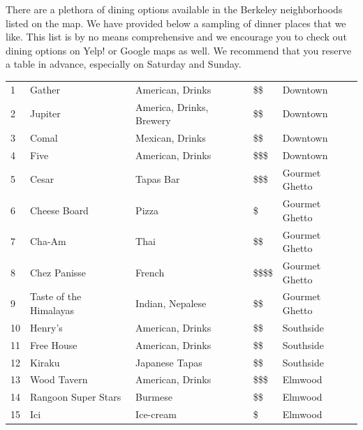 There are a plethora of dining options available in the Berkeley neighborhoods listed on the map. We have provided below a sampling of dinner places that we like. This list is by no means comprehensive and we encourage you to check out dining options on Yelp! or Google maps as well. We recommend that you reserve a table in advance, especially on Saturday and Sunday.

\begingroup
\small
\begin{multicols}{1}[]
    \begin{tabular}{p{0.3cm} p{4cm} p{5cm} p{1cm} p{2cm}}
        1 & Gather & American, Drinks & \$\$ & Downtown \\
        2 & Jupiter & America, Drinks, Brewery & \$\$ & Downtown \\
	    3 & Comal & Mexican, Drinks & \$\$ & Downtown \\       
	    4 & Five & American, Drinks & \$\$\$ & Downtown \\ 
        5 & Cesar & Tapas Bar & \$\$\$ & Gourmet Ghetto\\
        6 & Cheese Board & Pizza & \$ & Gourmet Ghetto \\
        7 & Cha-Am & Thai & \$\$ & Gourmet Ghetto\\
        8 & Chez Panisse & French & \$\$\$\$ & Gourmet Ghetto \\
        9 & Taste of the Himalayas & Indian, Nepalese & \$\$ & Gourmet Ghetto \\
        10 & Henry's & American, Drinks & \$\$ & Southside \\
        11 & Free House & American, Drinks & \$\$ & Southside \\
        12 & Kiraku & Japanese Tapas & \$\$ & Southside \\
        13 & Wood Tavern & American, Drinks & \$\$\$ & Elmwood \\
        14 & Rangoon Super Stars & Burmese & \$\$ & Elmwood\\
        15 & Ici & Ice-cream & \$ & Elmwood\\
    \end{tabular}
\end{multicols}
\endgroup
\normalsize 

